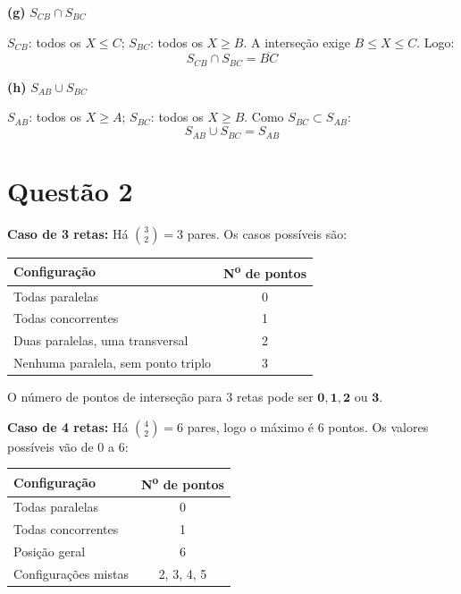 \documentclass[12pt,a4paper]{article}
\begin{document}
\textbf{(g)} $S_{CB} \cap S_{BC}$

$S_{CB}$: todos os $X \leq C$; $S_{BC}$: todos os $X \geq B$. A interse\c{c}\~ao exige $B \leq X \leq C$. Logo:
$$S_{CB} \cap S_{BC} = \overline{BC}$$

\textbf{(h)} $S_{AB} \cup S_{BC}$

$S_{AB}$: todos os $X \geq A$; $S_{BC}$: todos os $X \geq B$. Como $S_{BC} \subset S_{AB}$:
$$S_{AB} \cup S_{BC} = S_{AB}$$

\section*{Quest\~ao 2}

\textbf{Caso de 3 retas:} H\'a $\binom{3}{2} = 3$ pares. Os casos poss\'iveis s\~ao:

\begin{center}
\begin{tabular}{lc}
\toprule
Configura\c{c}\~ao & N\textsuperscript{o} de pontos \\
\midrule
Todas paralelas & 0 \\
Todas concorrentes & 1 \\
Duas paralelas, uma transversal & 2 \\
Nenhuma paralela, sem ponto triplo & 3 \\
\bottomrule
\end{tabular}
\end{center}

O n\'umero de pontos de interse\c{c}\~ao para 3 retas pode ser $\mathbf{0, 1, 2}$ ou $\mathbf{3}$.

\textbf{Caso de 4 retas:} H\'a $\binom{4}{2} = 6$ pares, logo o m\'aximo \'e 6 pontos. Os valores poss\'iveis v\~ao de $0$ a $6$:

\begin{center}
\begin{tabular}{lc}
\toprule
Configura\c{c}\~ao & N\textsuperscript{o} de pontos \\
\midrule
Todas paralelas & 0 \\
Todas concorrentes & 1 \\
Posi\c{c}\~ao geral & 6 \\
Configura\c{c}\~oes mistas & 2, 3, 4, 5 \\
\bottomrule
\end{tabular}
\end{center}
\end{document}
